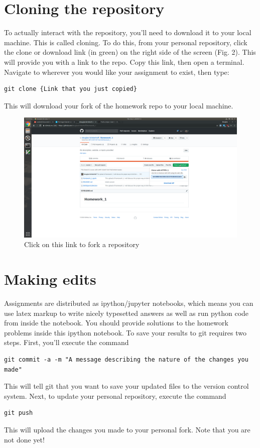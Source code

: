 \documentclass{article}
\begin{document}
\section{Cloning the repository}
To actually interact with the repository, you'll need to download it to your local machine.  This is called cloning.  To do this, from your personal repository, click the clone or download link (in green) on the right side of the screen (Fig. 2).  This will provide you with a link to the repo.  Copy this link, then open a terminal.  Navigate to wherever you would like your assignment to exist, then type:
\begin{verbatim}
git clone {Link that you just copied}
\end{verbatim}
This will download your fork of the homework repo to your local machine.  
\begin{figure}[h!]
\includegraphics[width=\linewidth]{clone.png}
\caption{Click on this link to fork a repository}
\end{figure}

\newpage


\section{Making edits}
Assignments are distributed as ipython/jupyter notebooks, which means you can use latex markup to write nicely typesetted answers as well as run python code from inside the notebook.  You should provide solutions to the homework problems inside this ipython notebook.  To save your results to git requires two steps.  First, you'll execute the command
\begin{verbatim}
git commit -a -m "A message describing the nature of the changes you made"
\end{verbatim}
This will tell git that you want to save your updated files to the version control system.  Next, to update your personal repository, execute the command
\begin{verbatim}
git push
\end{verbatim}
This will upload the changes you made to your personal fork.  Note that you are not done yet!
\end{document}
